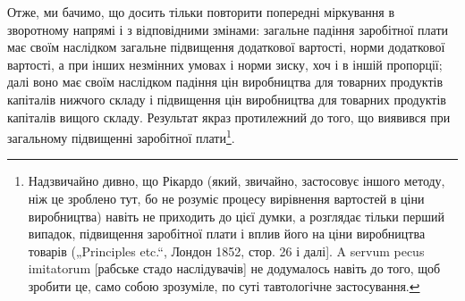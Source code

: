 Отже, ми бачимо, що досить тільки повторити попередні міркування в зворотному
напрямі і з відповідними змінами: загальне падіння заробітної плати має своїм
наслідком загальне підвищення додаткової вартості, норми додаткової вартості, а
при інших незмінних умовах і норми зиску, хоч і в
іншій пропорції; далі воно має своїм наслідком падіння цін виробництва для
товарних продуктів капіталів нижчого складу і підвищення цін виробництва для
товарних продуктів капіталів вищого складу. Результат якраз протилежний до того,
що  виявився при загальному підвищенні заробітної плати\footnote{
Надзвичайно дивно, що Рікардо (який, звичайно, застосовує іншого
методу, ніж це зроблено тут, бо не розуміє процесу вирівнення вартостей в ціни
виробництва) навіть не приходить до цієї думки, а розглядає тільки перший
випадок, підвищення заробітної плати і вплив його на ціни виробництва товарів
(„Principles etc.“, Лондон 1852, стор. 26 і далі]. A servum pecus
imitatorum [рабське стадо наслідувачів] не додумалось навіть до того, щоб
зробити це, само собою зрозуміле, по суті тавтологічне застосування.
}.
\parbreak{}  %
